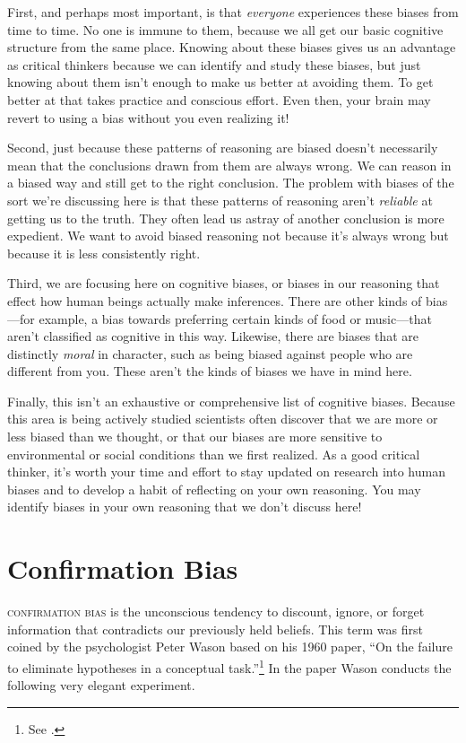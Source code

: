 First, and perhaps most important, is that \emph{everyone} experiences these biases from time to time. No one is immune to them, because we all get our basic cognitive structure from the same place. Knowing about these biases gives us an advantage as critical thinkers because we can identify and study these biases, but just knowing about them isn't enough to make us better at avoiding them. To get better at that takes practice and conscious effort. Even then, your brain may revert to using a bias without you even realizing it!

Second, just because these patterns of reasoning are biased doesn't necessarily mean that the conclusions drawn from them are always wrong. We can reason in a biased way and still get to the right conclusion. The problem with biases of the sort we're discussing here is that these patterns of reasoning aren't \emph{reliable} at getting us to the truth. They often lead us astray of another conclusion is more expedient. We want to avoid biased reasoning not because it's always wrong but because it is less consistently right.

Third, we are focusing here on cognitive biases, or biases in our reasoning that effect how human beings actually make inferences. There are other kinds of bias---for example, a bias towards preferring certain kinds of food or music---that aren't classified as cognitive in this way. Likewise, there are biases that are distinctly \emph{moral} in character, such as being biased against people who are different from you. These aren't the kinds of biases we have in mind here.

Finally, this isn't an exhaustive or comprehensive list of cognitive biases. Because this area is being actively studied scientists often discover that we are more or less biased than we thought, or that our biases are more sensitive to environmental or social conditions than we first realized. As a good critical thinker, it's worth your time and effort to stay updated on research into human biases and to develop a habit of reflecting on your own reasoning. You may identify biases in your own reasoning that we don't discuss here!

\section{Confirmation Bias}

\textsc{\Gls{confirmation bias}} is the unconscious tendency to discount, ignore, or forget information that contradicts our previously held beliefs. This term was first coined by the psychologist Peter Wason based on his 1960 paper, ``On the failure to eliminate hypotheses in a conceptual task.''\footnote{See \cite{wason1960}.} In the paper Wason conducts the following very elegant experiment. 

